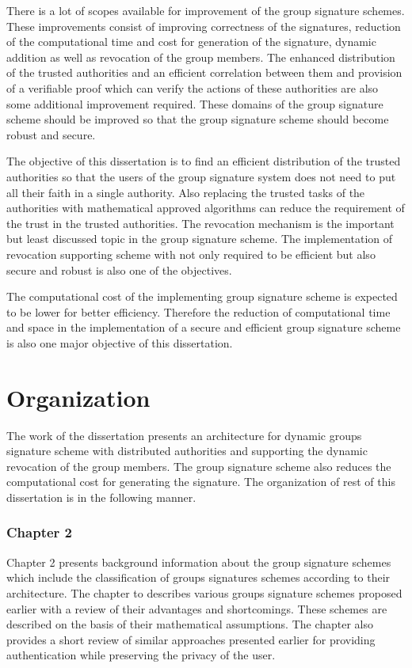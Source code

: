 There is a lot of scopes available for improvement of the group signature schemes. These improvements consist of improving correctness of the signatures, reduction of the computational time and cost for generation of the signature, dynamic addition as well as revocation of the group members. The enhanced distribution of the trusted authorities and an efficient correlation between them and provision of a verifiable proof which can verify the actions of these authorities are also some additional improvement required. These domains of the group signature scheme should be improved so that the group signature scheme should become robust and secure.

The objective of this dissertation is to find an efficient distribution of the trusted authorities so that the users of the group signature system does not need to put all their faith in a single authority. Also replacing the trusted tasks of the authorities with mathematical approved algorithms can reduce the requirement of the trust in the trusted authorities. The revocation mechanism is the important but least discussed topic in the group signature scheme. The implementation of revocation supporting scheme with not only required to be efficient but also secure and robust is also one of the objectives. 

The computational cost of the implementing group signature scheme is expected to be lower for better efficiency. Therefore the reduction of computational time and space in the implementation of a secure and efficient group signature scheme is also one major objective of this dissertation. 

\section{Organization}
The work of the dissertation presents an architecture for dynamic groups signature scheme with distributed authorities and supporting the dynamic revocation of the group members. The group signature scheme also reduces the computational cost for generating the signature. The organization of rest of this dissertation is in the following manner.
\subsubsection{Chapter 2}
Chapter 2 presents background information about the group signature schemes which include the classification of groups signatures schemes according to their architecture. The chapter to describes various groups signature schemes proposed earlier with a review of their advantages and shortcomings. These schemes are described on the basis of their mathematical assumptions. The chapter also provides a short review of similar approaches presented earlier for providing authentication while preserving the privacy of the user.

